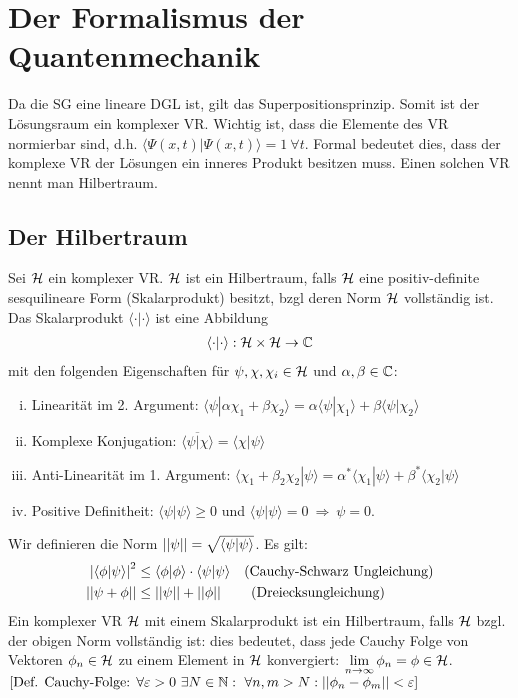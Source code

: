 \section{Der Formalismus der Quantenmechanik}


Da die SG eine lineare DGL ist, gilt das Superpositionsprinzip. Somit ist
der Lösungsraum ein komplexer VR. Wichtig ist, dass die Elemente des VR
normierbar sind, d.h. $\langle \Psi(x,t) | \Psi(x,t) \rangle = 1 \ \forall t$.
Formal bedeutet dies, dass der komplexe VR der Lösungen ein inneres Produkt
besitzen muss. Einen solchen VR nennt man Hilbertraum.

\subsection{Der Hilbertraum}

Sei $\mathcal{H}$ ein komplexer VR. $\mathcal{H}$ ist ein Hilbertraum, falls $\mathcal{H}$ eine positiv-definite
sesquilineare Form (Skalarprodukt) besitzt, bzgl deren Norm $\mathcal{H}$ vollständig ist.
Das Skalarprodukt $\langle \cdot | \cdot \rangle$ ist eine Abbildung
\begin{align*}
    \langle \cdot | \cdot \rangle : \mathcal{H} \times \mathcal{H} \rightarrow \mathbb{C}
\end{align*}
mit den folgenden Eigenschaften für $\psi, \chi, \chi_i \in \mathcal{H}$ und $\alpha,\beta \in \mathbb{C}$:
\begin{enumerate}[(i)]
    \item Linearität im 2. Argument: $\langle \psi | \alpha \chi_1 + \beta \chi_2 \rangle
        = \alpha \langle \psi | \chi_1 \rangle + \beta \langle \psi | \chi_2 \rangle$
    \item Komplexe Konjugation: $\overline{\langle \psi | \chi \rangle} = \langle \chi | \psi \rangle$
    \item Anti-Linearität im 1. Argument: $\langle \chi_1 + \beta_2 \chi_2 | \psi \rangle
        = \alpha^\ast \langle \chi_1 | \psi \rangle + \beta^\ast \langle \chi_2 | \psi \rangle$
    \item Positive Definitheit: $\langle \psi | \psi \rangle \geq 0$ und
        $\langle \psi | \psi \rangle = 0 \ \Rightarrow \ \psi = 0$.
\end{enumerate}
Wir definieren die Norm $\left\vert\left\vert \psi \right\vert\right\vert = \sqrt{\langle \psi | \psi \rangle}$.
Es gilt:
\begin{align*}
    \left\vert \langle \phi | \psi \rangle \right\vert^2 &\leq \langle \phi | \phi \rangle \cdot \langle \psi | \psi \rangle
    \hspace{10pt} \text{(Cauchy-Schwarz Ungleichung)}
    \\
    \left\vert\left\vert \psi + \phi \right\vert\right\vert &\leq \left\vert\left\vert \psi \right\vert\right\vert + \left\vert\left\vert \phi \right\vert\right\vert
    \hspace{20pt} \text{(Dreiecksungleichung)}
\end{align*}
Ein komplexer VR $\mathcal{H}$ mit einem Skalarprodukt ist ein Hilbertraum, falls $\mathcal{H}$ bzgl.
der obigen Norm vollständig ist: dies bedeutet, dass jede Cauchy Folge von
Vektoren $\phi_n \in \mathcal{H}$ zu einem Element in $\mathcal{H}$ konvergiert:
$\lim\limits_{n \rightarrow \infty} \phi_n = \phi \in \mathcal{H}$. $\left[ \text{Def. Cauchy-Folge: }
\forall \varepsilon > 0 \ \exists N \in \mathbb{N} : \ \forall n,m > N: \left\vert\left\vert \phi_n - \phi_m \right\vert\right\vert
< \varepsilon \right]$


